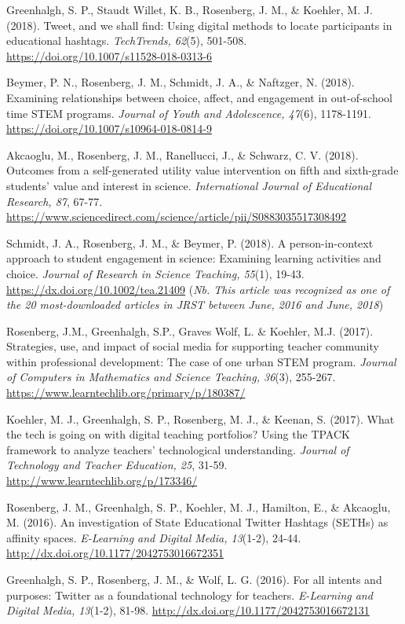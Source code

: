 \documentclass[14,]{article}
\begin{document}
Greenhalgh, S. P., Staudt Willet, K. B., Rosenberg, J. M., \& Koehler,
M. J. (2018). Tweet, and we shall find: Using digital methods to locate
participants in educational hashtags. \emph{TechTrends, 62}(5), 501-508.
\url{https://doi.org/10.1007/s11528-018-0313-6}

Beymer, P. N., Rosenberg, J. M., Schmidt, J. A., \& Naftzger, N. (2018).
Examining relationships between choice, affect, and engagement in
out-of-school time STEM programs. \emph{Journal of Youth and
Adolescence, 47}(6), 1178-1191.
\url{https://doi.org/10.1007/s10964-018-0814-9}

Akcaoglu, M., Rosenberg, J. M., Ranellucci, J., \& Schwarz, C. V.
(2018). Outcomes from a self-generated utility value intervention on
fifth and sixth-grade students' value and interest in science.
\emph{International Journal of Educational Research, 87}, 67-77.
\url{https://www.sciencedirect.com/science/article/pii/S0883035517308492}

Schmidt, J. A., Rosenberg, J. M., \& Beymer, P. (2018). A
person-in-context approach to student engagement in science: Examining
learning activities and choice. \emph{Journal of Research in Science
Teaching, 55}(1), 19-43. \url{https://dx.doi.org/10.1002/tea.21409}
(\emph{Nb. This article was recognized as one of the 20 most-downloaded
articles in JRST between June, 2016 and June, 2018})

Rosenberg, J.M., Greenhalgh, S.P., Graves Wolf, L. \& Koehler, M.J.
(2017). Strategies, use, and impact of social media for supporting
teacher community within professional development: The case of one urban
STEM program. \emph{Journal of Computers in Mathematics and Science
Teaching, 36}(3), 255-267.
\url{https://www.learntechlib.org/primary/p/180387/}

Koehler, M. J., Greenhalgh, S. P., Rosenberg, M. J., \& Keenan, S.
(2017). What the tech is going on with digital teaching portfolios?
Using the TPACK framework to analyze teachers' technological
understanding. \emph{Journal of Technology and Teacher Education, 25},
31-59. \url{http://www.learntechlib.org/p/173346/}

Rosenberg, J. M., Greenhalgh, S. P., Koehler, M. J., Hamilton, E., \&
Akcaoglu, M. (2016). An investigation of State Educational Twitter
Hashtags (SETHs) as affinity spaces. \emph{E-Learning and Digital Media,
13}(1-2), 24-44. \url{http://dx.doi.org/10.1177/2042753016672351}

Greenhalgh, S. P., Rosenberg, J. M., \& Wolf, L. G. (2016). For all
intents and purposes: Twitter as a foundational technology for teachers.
\emph{E-Learning and Digital Media, 13}(1-2), 81-98.
\url{http://dx.doi.org/10.1177/2042753016672131}
\end{document}
